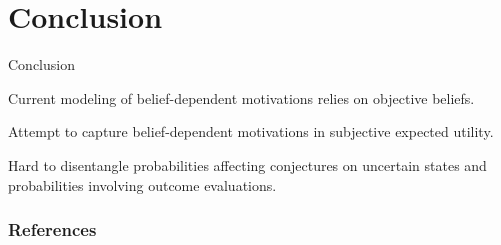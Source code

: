 \documentclass[usenames,dvipsnames,aspectratio=169,11pt,envcountsect, handout]{beamer}
\begin{document}
\section{Conclusion}

\begin{frame}{Conclusion}

	Current modeling of belief-dependent motivations relies on objective beliefs.

	\vfill

	Attempt to capture belief-dependent motivations in subjective expected utility.

	\vfill

	Hard to disentangle probabilities affecting conjectures on uncertain states and probabilities involving outcome evaluations.

\end{frame}

\begin{frame}

	\frametitle{References}

	
	


\end{frame}
\end{document}
